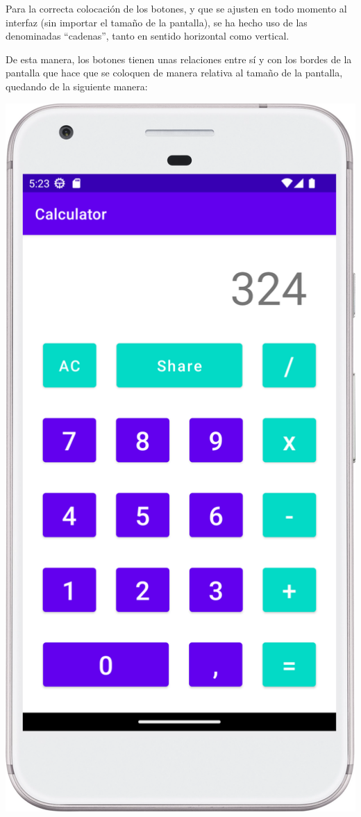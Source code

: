 \documentclass{\ClassPath/viu-tfm-template}
\begin{document}
Para la correcta colocación de los botones, y que se ajusten en todo momento al interfaz (sin importar el tamaño de la pantalla), se ha hecho uso de las denominadas “cadenas”, tanto en sentido horizontal como vertical.

De esta manera, los botones tienen unas relaciones entre sí y con los bordes de la pantalla que hace que se coloquen de manera relativa al tamaño de la pantalla, quedando de la siguiente manera:


{
    \begin{minipage}{0.4\linewidth}
        \includegraphics[width=\linewidth]{img/phone1.png}

\end{minipage}}
\end{document}
